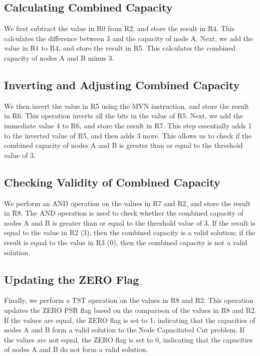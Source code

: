 \subsection{Calculating Combined Capacity}

We first subtract the value in R0 from R2, and store the result in R4. This calculates the difference between 3 and the capacity of node A. Next, we add the value in R1 to R4, and store the result in R5. This calculates the combined capacity of nodes A and B minus 3. 

\subsection{Inverting and Adjusting Combined Capacity}

We then invert the value in R5 using the MVN instruction, and store the result in R6. This operation inverts all the bits in the value of R5. Next, we add the immediate value 4 to R6, and store the result in R7. This step essentially adds 1 to the inverted value of R5, and then adds 3 more. This allows us to check if the combined capacity of nodes A and B is greater than or equal to the threshold value of 3.

\subsection{Checking Validity of Combined Capacity}

We perform an AND operation on the values in R7 and R2, and store the result in R8. The AND operation is used to check whether the combined capacity of nodes A and B is greater than or equal to the threshold value of 3. If the result is equal to the value in R2 (3), then the combined capacity is a valid solution; if the result is equal to the value in R3 (0), then the combined capacity is not a valid solution.

\subsection{Updating the ZERO Flag}

Finally, we perform a TST operation on the values in R8 and R2. This operation updates the ZERO PSR flag based on the comparison of the values in R8 and R2. If the values are equal, the ZERO flag is set to 1, indicating that the capacities of nodes A and B form a valid solution to the Node Capacitated Cut problem. If the values are not equal, the ZERO flag is set to 0, indicating that the capacities of nodes A and B do not form a valid solution.

